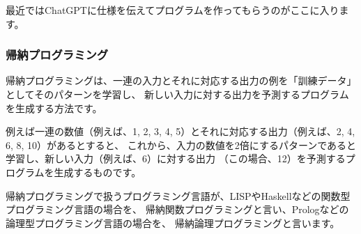 \documentclass[a4j,dvipdfmx]{jsarticle}
\begin{document}
最近ではChatGPTに仕様を伝えてプログラムを作ってもらうのがここに入ります。

\subsubsection{帰納プログラミング}
帰納プログラミングは、一連の入力とそれに対応する出力の例を「訓練データ」としてそのパターンを学習し、
新しい入力に対する出力を予測するプログラムを生成する方法です。

例えば一連の数値（例えば、1, 2, 3, 4, 5）とそれに対応する出力（例えば、2, 4, 6, 8, 10）があるとすると、
これから、入力の数値を2倍にするパターンであると学習し、新しい入力（例えば、6）に対する出力
（この場合、12）を予測するプログラムを生成するものです。

帰納プログラミングで扱うプログラミング言語が、LISPやHaskellなどの関数型プログラミング言語の場合を、
帰納関数プログラミングと言い、Prologなどの論理型プログラミング言語の場合を、
帰納論理プログラミングと言います。
\end{document}
